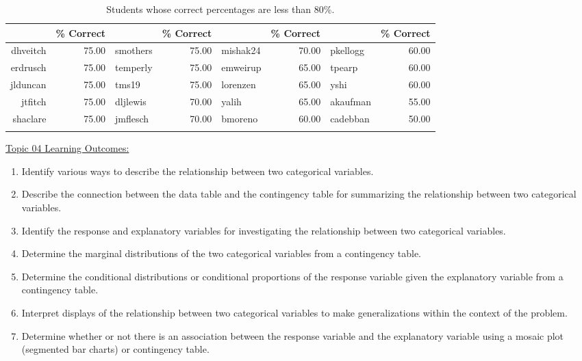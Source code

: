 \documentclass[12pt,english,nohyper]{tufte-handout}\usepackage[]{graphicx}\usepackage[]{color}
\begin{document}
\begin{fullwidth}
\makeatletter\setlength\hsize{\@tufte@fullwidth}\makeatother
\begin{longtable}{rr|lr|lr|lr}
  \hline
  & \% Correct &   & \% Correct &   & \% Correct &   & \% Correct \\ 
  \hline
dhveitch & 75.00 & smothers & 75.00 & mishak24 & 70.00 & pkellogg & 60.00 \\ 
  erdrusch & 75.00 & temperly & 75.00 & emweirup & 65.00 & tpearp & 60.00 \\ 
  jlduncan & 75.00 & tms19 & 75.00 & lorenzen & 65.00 & yshi & 60.00 \\ 
  jtfitch & 75.00 & dljlewis & 70.00 & yalih & 65.00 & akaufman & 55.00 \\ 
  shaclare & 75.00 & jmflesch & 70.00 & bmoreno & 60.00 & cadebban & 50.00 \\ 
   \hline
\hline
\caption{Students whose correct percentages are less than 80\%.} 
\label{tab:studentsbelow80}
\end{longtable}

\end{fullwidth}



\vspace{-2mm}

\noindent
\underline{Topic 04 Learning Outcomes:}
\vspace{2mm}

\begin{fullwidth}
\begin{enumerate}[label=\Alph*.,itemsep=-\parsep,leftmargin=*]
  \item
Identify various ways to describe the relationship between two categorical variables.
\item Describe the connection between the data table and the contingency table for summarizing the relationship between two categorical variables.
\item Identify the response and explanatory variables for investigating the relationship between two categorical variables.
\item Determine the marginal distributions of the two categorical variables from a contingency table.
\item Determine the conditional distributions or conditional proportions of the response variable given the explanatory variable from a contingency table.
\item Interpret displays of the relationship between two categorical variables to make generalizations within the context of the problem.
\item Determine whether or not there is an association between the response variable and the explanatory variable using a mosaic plot (segmented bar charts) or contingency table.

\end{enumerate}
\end{fullwidth}
\end{document}
